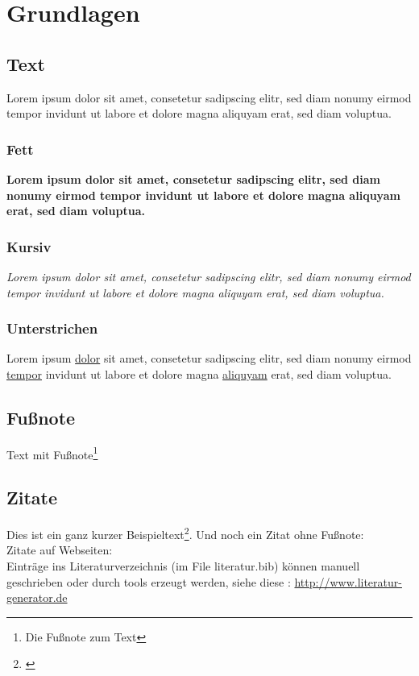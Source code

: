 \chapter{Grundlagen}
\section{Text}
Lorem ipsum dolor sit amet, consetetur sadipscing elitr, sed diam nonumy eirmod tempor invidunt ut labore et dolore magna aliquyam erat, sed diam voluptua.

\subsection{Fett}
\textbf{Lorem ipsum dolor sit amet, consetetur sadipscing elitr, sed diam nonumy eirmod tempor invidunt ut labore et dolore magna aliquyam erat, sed diam voluptua.}

\subsection{Kursiv}
\textit{Lorem ipsum dolor sit amet, consetetur sadipscing elitr, sed diam nonumy eirmod tempor invidunt ut labore et dolore magna aliquyam erat, sed diam voluptua.}

\subsection{Unterstrichen}
Lorem ipsum \underline{dolor} sit amet, consetetur sadipscing elitr, sed diam nonumy eirmod \underline{tempor} invidunt ut labore et dolore magna \underline{aliquyam} erat, sed diam voluptua.

\section{Fußnote}

Text mit Fußnote\footnote{Die Fußnote zum Text}

\section{Zitate}

Dies ist ein ganz kurzer Beispieltext\footnote{\cite{Richter2016}}. Und noch ein Zitat ohne Fußnote:~\cite{Jacobsen2017}
\\
Zitate auf Webseiten:~\cite{PlutoRed}
\\
Einträge ins Literaturverzeichnis (im File literatur.bib) können manuell geschrieben\citationneeded{} oder durch tools erzeugt werden, siehe diese : \url{http://www.literatur-generator.de}

